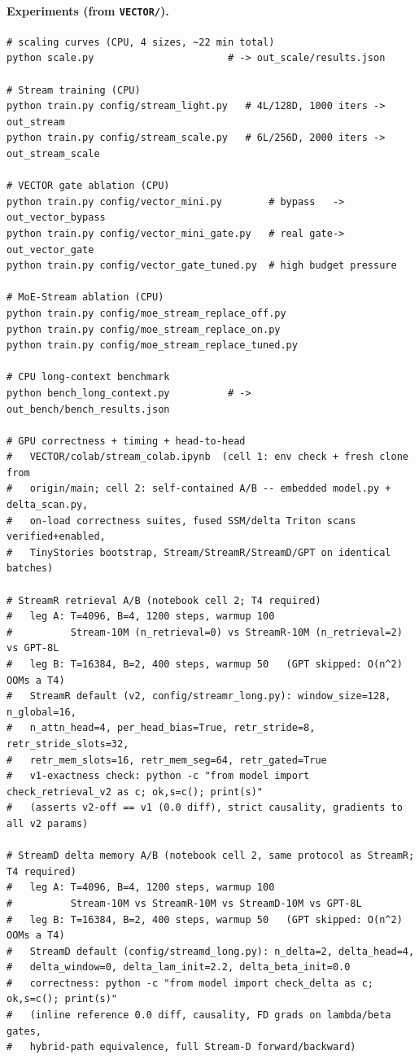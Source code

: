\documentclass[11pt]{article}
\begin{document}
\paragraph{Experiments (from \texttt{VECTOR/}).}
\begin{verbatim}
# scaling curves (CPU, 4 sizes, ~22 min total)
python scale.py                       # -> out_scale/results.json

# Stream training (CPU)
python train.py config/stream_light.py   # 4L/128D, 1000 iters -> out_stream
python train.py config/stream_scale.py   # 6L/256D, 2000 iters -> out_stream_scale

# VECTOR gate ablation (CPU)
python train.py config/vector_mini.py        # bypass   -> out_vector_bypass
python train.py config/vector_mini_gate.py   # real gate-> out_vector_gate
python train.py config/vector_gate_tuned.py  # high budget pressure

# MoE-Stream ablation (CPU)
python train.py config/moe_stream_replace_off.py
python train.py config/moe_stream_replace_on.py
python train.py config/moe_stream_replace_tuned.py

# CPU long-context benchmark
python bench_long_context.py          # -> out_bench/bench_results.json

# GPU correctness + timing + head-to-head
#   VECTOR/colab/stream_colab.ipynb  (cell 1: env check + fresh clone from
#   origin/main; cell 2: self-contained A/B -- embedded model.py + delta_scan.py,
#   on-load correctness suites, fused SSM/delta Triton scans verified+enabled,
#   TinyStories bootstrap, Stream/StreamR/StreamD/GPT on identical batches)

# StreamR retrieval A/B (notebook cell 2; T4 required)
#   leg A: T=4096, B=4, 1200 steps, warmup 100
#          Stream-10M (n_retrieval=0) vs StreamR-10M (n_retrieval=2) vs GPT-8L
#   leg B: T=16384, B=2, 400 steps, warmup 50   (GPT skipped: O(n^2) OOMs a T4)
#   StreamR default (v2, config/streamr_long.py): window_size=128, n_global=16,
#   n_attn_head=4, per_head_bias=True, retr_stride=8, retr_stride_slots=32,
#   retr_mem_slots=16, retr_mem_seg=64, retr_gated=True
#   v1-exactness check: python -c "from model import check_retrieval_v2 as c; ok,s=c(); print(s)"
#   (asserts v2-off == v1 (0.0 diff), strict causality, gradients to all v2 params)

# StreamD delta memory A/B (notebook cell 2, same protocol as StreamR; T4 required)
#   leg A: T=4096, B=4, 1200 steps, warmup 100
#          Stream-10M vs StreamR-10M vs StreamD-10M vs GPT-8L
#   leg B: T=16384, B=2, 400 steps, warmup 50   (GPT skipped: O(n^2) OOMs a T4)
#   StreamD default (config/streamd_long.py): n_delta=2, delta_head=4,
#   delta_window=0, delta_lam_init=2.2, delta_beta_init=0.0
#   correctness: python -c "from model import check_delta as c; ok,s=c(); print(s)"
#   (inline reference 0.0 diff, causality, FD grads on lambda/beta gates,
#   hybrid-path equivalence, full Stream-D forward/backward)
\end{verbatim}
\end{document}

